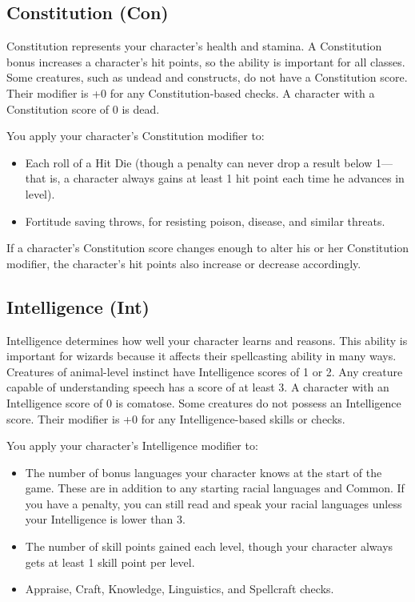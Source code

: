 \subsection{Constitution (Con)}

				
Constitution represents your character's health and stamina. A Constitution bonus increases a character's hit points, so the ability is important for all classes. Some creatures, such as undead and constructs, do not have a Constitution score. Their modifier is +0 for any Constitution-based checks. A character with a Constitution score of 0 is dead. 
				
You apply your character's Constitution modifier to:
				\begin{itemize}\item  Each roll of a Hit Die (though a penalty can never drop a result below 1---that is, a character always gains at least 1 hit point each time he advances in level).
				\item  Fortitude saving throws, for resisting poison, disease, and similar threats.
\end{itemize}
				
If a character's Constitution score changes enough to alter his or her Constitution modifier, the character's hit points also increase or decrease accordingly.
				
\subsection{Intelligence (Int)}

				
Intelligence determines how well your character learns and reasons. This ability is important for wizards because it affects their spellcasting ability in many ways. Creatures of animal-level instinct have Intelligence scores of 1 or 2. Any creature capable of understanding speech has a score of at least 3. A character with an Intelligence score of 0 is comatose. Some creatures do not possess an Intelligence score. Their modifier is +0 for any Intelligence-based skills or checks.
				
You apply your character's Intelligence modifier to:
				\begin{itemize}\item  The number of bonus languages your character knows at the start of the game. These are in addition to any starting racial languages and Common. If you have a penalty, you can still read and speak your racial languages unless your Intelligence is lower than 3.
				\item  The number of skill points gained each level, though your character always gets at least 1 skill point per level.
				\item  Appraise, Craft, Knowledge, Linguistics, and Spellcraft checks.
\end{itemize}
				
